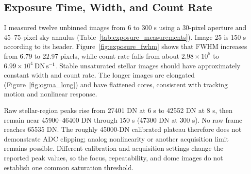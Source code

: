 \documentclass[12pt,letterpaper,twocolumn]{article}
\begin{document}
\subsection{Exposure Time, Width, and Count Rate}
I measured twelve unbinned images from 6 to 300 s using a
30-pixel aperture and 45--75-pixel sky annulus
(Table~\ref{tab:exposure_measurements}). Image 25 is 150 s according
to its header. Figure~\ref{fig:exposure_fwhm} shows that FWHM increases from 6.79 to 22.97 pixels, while
count rate falls from about $2.98\times10^5$ to
$6.99\times10^4~\mathrm{DN\,s^{-1}}$. Stable unsaturated stellar
images should have approximately constant width and count rate.
The longer images are elongated (Figure~\ref{fig:ogma_long}) and have flattened cores,
consistent with tracking motion and nonlinear response.

Raw stellar-region peaks rise from 27401 DN at 6 s to 42552 DN at
8 s, then remain near 45900--46400 DN through 150 s (47300 DN at
300 s). No raw frame reaches 65535 DN. The roughly 45000-DN
calibrated plateau therefore does not demonstrate ADC clipping;
analog nonlinearity or another acquisition limit remains possible.
Different calibration and acquisition settings change the reported peak values, so the focus, repeatability, and dome images do not establish one common saturation threshold.
\end{document}
